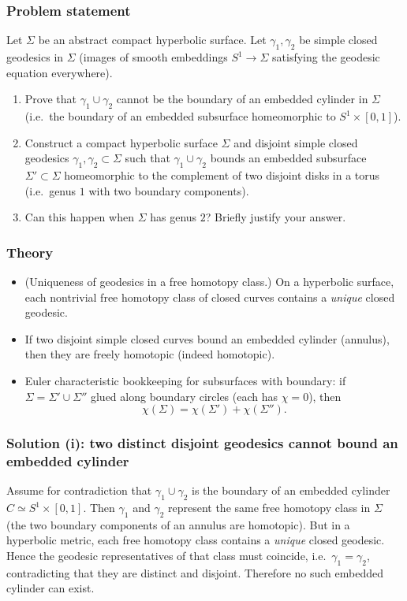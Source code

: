 \documentclass[12pt,a4paper]{article}
\theoremstyle{plain}
\theoremstyle{definition}      %
\begin{document}
\subsubsection*{Problem statement}
Let $\Sigma$ be an abstract compact hyperbolic surface.
Let $\gamma_1,\gamma_2$ be simple closed geodesics in $\Sigma$ (images of smooth embeddings $S^1\to\Sigma$
satisfying the geodesic equation everywhere).

\begin{enumerate}
	
	\item Prove that $\gamma_1\cup\gamma_2$ cannot be the boundary of an embedded cylinder in $\Sigma$
	(i.e.\ the boundary of an embedded subsurface homeomorphic to $S^1\times[0,1]$).
	\item Construct a compact hyperbolic surface $\Sigma$ and disjoint simple closed geodesics $\gamma_1,\gamma_2\subset \Sigma$
	such that $\gamma_1\cup\gamma_2$ bounds an embedded subsurface $\Sigma'\subset \Sigma$ homeomorphic to the complement
	of two disjoint disks in a torus (i.e.\ genus $1$ with two boundary components).
	\item Can this happen when $\Sigma$ has genus $2$? Briefly justify your answer.
\end{enumerate}

\subsubsection*{Theory}
\begin{itemize}
	\item (Uniqueness of geodesics in a free homotopy class.)
	On a hyperbolic surface, each nontrivial free homotopy class of closed curves contains a \emph{unique} closed geodesic.
	\item If two disjoint simple closed curves bound an embedded cylinder (annulus), then they are freely homotopic (indeed homotopic).
	\item Euler characteristic bookkeeping for subsurfaces with boundary:
	if $\Sigma=\Sigma'\cup \Sigma''$ glued along boundary circles (each has $\chi=0$), then
	\[
	\chi(\Sigma)=\chi(\Sigma')+\chi(\Sigma'').
	\]
\end{itemize}

\subsubsection*{Solution (i): two distinct disjoint geodesics cannot bound an embedded cylinder}
Assume for contradiction that $\gamma_1\cup\gamma_2$ is the boundary of an embedded cylinder $C\simeq S^1\times[0,1]$.
Then $\gamma_1$ and $\gamma_2$ represent the same free homotopy class in $\Sigma$ (the two boundary components of an annulus are homotopic).
But in a hyperbolic metric, each free homotopy class contains a \emph{unique} closed geodesic.
Hence the geodesic representatives of that class must coincide, i.e.\ $\gamma_1=\gamma_2$, contradicting that they are distinct and disjoint.
Therefore no such embedded cylinder can exist.
\end{document}
